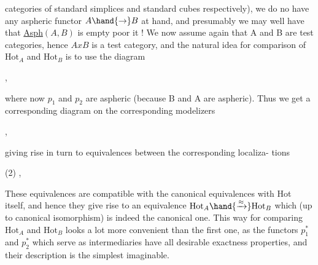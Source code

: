
categories of standard simplices and standard cubes respectively), we
do no have any aspheric functor $A\hand{\to} B$ at hand, and presumably we may
well have that \uline{Asph}$(A,B)$ is empty\hand{,} poor it ! We now assume again that
A and B are test categories, hence $AxB$ is a test category, and the
natural idea for comparison of $\mathrm{Hot}_A$ and $\mathrm{Hot}_B$ is to use the diagram

\quad ,

where now $p_1$ and $p_2$ are aspheric (because B and A are aspheric). Thus
we get a corresponding diagram on the corresponding modelizers

\quad ,

giving rise in turn to equivalences between the corresponding localiza-%
tions

(2)\qquad
{}\quad ,

These equivalences are compatible with the canonical  equivalences
with Hot itself, and hence they give rise to an equivalence $\mathrm{Hot}_A\hand{\xrightarrow{\approx}}\mathrm{Hot}_B$
which (up to canonical isomorphism) is indeed the canonical one. This
way for comparing $\mathrm{Hot}_A$ and $\mathrm{Hot}_B$ looks a lot more convenient than the
first one, as the functors $p_1^{*}$ and $p_2^{*}$ which serve as intermediaries
have all desirable exactness properties, and their  description is the
simplest imaginable.

